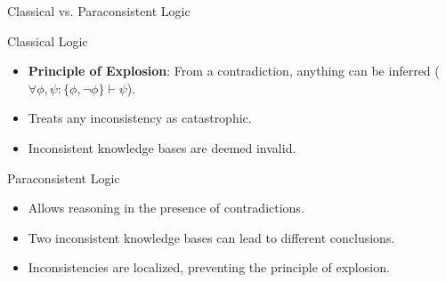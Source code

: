 \begin{frame}{Classical vs. Paraconsistent Logic}
    \begin{block}{Classical Logic}
        \begin{itemize}
            \item \textbf{Principle of Explosion}: From a contradiction, anything can be inferred (\( \forall \phi, \psi: \{\phi, \neg \phi\} \vdash \psi \)).
            \item Treats any inconsistency as catastrophic.
            \item Inconsistent knowledge bases are deemed invalid.
        \end{itemize}
    \end{block}
    \begin{block}{Paraconsistent Logic}
        \begin{itemize}
            \item Allows reasoning in the presence of contradictions.
            \item Two inconsistent knowledge bases can lead to different conclusions.
            \item Inconsistencies are localized, preventing the principle of explosion.
        \end{itemize}
    \end{block}
\end{frame}

